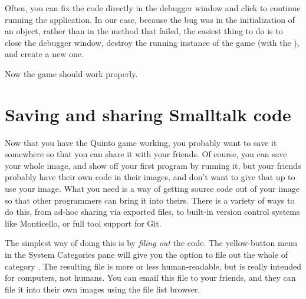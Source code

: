 \documentclass[a4paper,10pt,twoside]{book}
\begin{document}
\dothis{Close the debugger window.
	Add the expression ``\ct{^ cell}'' to the end of the method \ct{SBEGame>>>newCellAt:at:} so that it returns \ct{cell}.
	(See \mthref{newCellAt:at:nobug}.)}



Often, you can fix the code directly in the debugger window and click  to continue running the application.
In our case, because the bug was in the initialization of an object, rather than in the method that failed, the easiest thing to do is to close the debugger window, destroy the running instance of the game (with the ), and create a new one.

Now the game should work properly.

\section{Saving and sharing Smalltalk code}
\label{sec:Monticello}

Now that you have the Quinto game working, you probably want to save it somewhere so that you can share it with your friends.
Of course, you can save your whole \squeak image, and show off your first program by running it, but your friends probably have their own code in their images, and don't want to give that up to use your image.
What you need is a way of getting source code out of your \squeak image so that other programmers can bring it into theirs.
There is a variety of ways to do this, from ad-hoc sharing via exported files, to built-in version control systems like Monticello, or full tool support for Git.

The simplest way of doing this is by \emph{filing out} the code.
The yellow-button menu in the System Categories pane will give you the option to file out the whole of category .
The resulting file is more or less human-readable, but is really intended for computers, not humans.
You can email this file to your friends, and they can file it into their own \squeak images using the file list browser.
\end{document}
